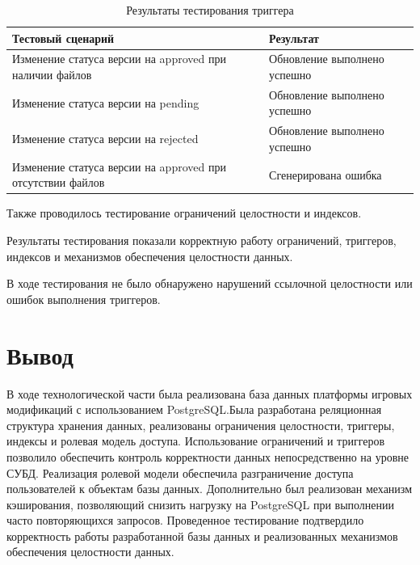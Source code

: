 \begin{table}[h]
	\centering
	\caption{Результаты тестирования триггера}
	\label{tab:trigger_test}
	\begin{tabular}{|p{6cm}|p{6cm}|}
		\hline
		Тестовый сценарий & Результат \\
		\hline
		Изменение статуса версии на approved при наличии файлов &
		Обновление выполнено успешно \\
		\hline
		Изменение статуса версии на pending &
		Обновление выполнено успешно \\
		\hline
		Изменение статуса версии на rejected &
		Обновление выполнено успешно \\
		\hline
		Изменение статуса версии на approved при отсутствии файлов &
		Сгенерирована ошибка \\
		\hline
	\end{tabular}
\end{table}

Также проводилось тестирование ограничений целостности и индексов.

Результаты тестирования показали корректную работу ограничений,
триггеров, индексов и механизмов обеспечения целостности данных.

В ходе тестирования не было обнаружено нарушений ссылочной целостности
или ошибок выполнения триггеров.

\section{Вывод}

В ходе технологической части была реализована база данных платформы
игровых модификаций с использованием PostgreSQL.Была разработана реляционная структура хранения данных, реализованы
ограничения целостности, триггеры, индексы и ролевая модель доступа. Использование ограничений и триггеров позволило обеспечить контроль
корректности данных непосредственно на уровне СУБД. Реализация ролевой модели обеспечила разграничение доступа пользователей
к объектам базы данных. Дополнительно был реализован механизм кэширования, позволяющий снизить
нагрузку на PostgreSQL при выполнении часто повторяющихся запросов. Проведенное тестирование подтвердило корректность работы разработанной
базы данных и реализованных механизмов обеспечения целостности данных.